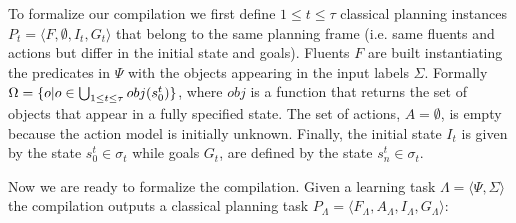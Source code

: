 \documentclass{article}
\newcommand{\tup}[1]{{\langle #1 \rangle}}
\begin{document}
To formalize our compilation we first define {\small $1\leq t\leq \tau$} classical planning instances $P_t=\tup{F,\emptyset,I_t,G_t}$ that belong to the same planning frame (i.e. same fluents and actions but differ in the initial state and goals). Fluents $F$ are built instantiating the predicates in $\Psi$ with the objects appearing in the input labels $\Sigma$. Formally $\Omega=\{o|o\in \bigcup_{\small 1\leq t\leq \tau} obj(s_0^t)\}$, where $obj$ is a function that returns the set of objects that appear in a fully specified state. The set of actions, $A=\emptyset$, is empty because the action model is initially unknown. Finally, the initial state $I_t$ is given by the state $s_0^t\in \sigma_t$ while goals $G_t$, are defined by the state $s_n^t\in \sigma_t$.

Now we are ready to formalize the compilation. Given a learning task $\Lambda=\tup{\Psi,\Sigma}$ the compilation outputs a classical planning task $P_{\Lambda}=\tup{F_{\Lambda},A_{\Lambda},I_{\Lambda},G_{\Lambda}}$:
\end{document}
